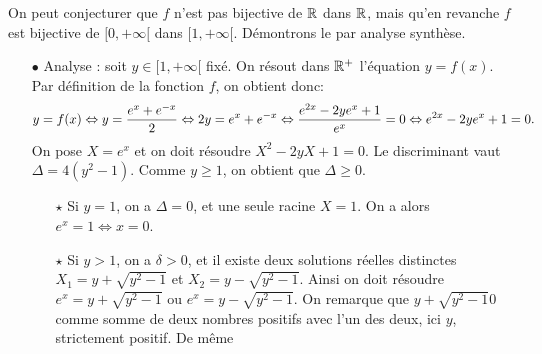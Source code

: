 \documentclass[a4paper, 11pt,reqno]{article}
\begin{document}
\begin{correction}
	On peut conjecturer que $f$ n'est pas bijective de $\mathbb{R}$ dans $\mathbb{R}$, mais qu'en revanche $f$ est bijective de $[0,+\infty[$ dans $[1, +\infty[$. D\'emontrons le par analyse synth\`ese.
	\begin{itemize}
		\item[$\bullet$] Analyse : soit $y\in \lbrack 1,+\infty\lbrack$ fix\'e. On r\'esout dans $\mathbb{R}^+$ l'\'equation $y=f(x)$. Par d\'efinition de la fonction $f$, on obtient donc:
			$$y=f(x)\Leftrightarrow y=\displaystyle\frac{e^x+e^{-x}}{2}\Leftrightarrow 2y=e^x+e^{-x}\Leftrightarrow \displaystyle\frac{ e^{2x}-2ye^x+1 }{e^x}=0\Leftrightarrow e^{2x}-2ye^x+1=0.$$
			On pose $X=e^x$ et on doit r\'esoudre $X^2-2yX+1=0$. Le discriminant vaut $\Delta=4(y^2-1)$. Comme $y\geq 1$, on obtient que $\Delta\geq 0$.
			\begin{itemize}
				\item[$\star$] Si $y=1$, on a $\Delta = 0$, et une seule racine $X=1$. On a alors $e^x=1 \Leftrightarrow x=0$.
				\item[$\star$] Si $y>1$, on a $\delta >0$, et il existe deux solutions r\'eelles distinctes $X_1=y+\sqrt{y^2-1}$ et $X_2=y-\sqrt{y^2-1}$. Ainsi on doit r\'esoudre $e^x=y+\sqrt{y^2-1}$ ou $e^x=y-\sqrt{y^2-1}$. On remarque que $y+\sqrt{y^2-1}0$ comme somme de deux nombres positifs avec l'un des deux, ici $y$, strictement positif. De m\^{e}me

\end{itemize}
\end{itemize}
\end{correction}
\end{document}

